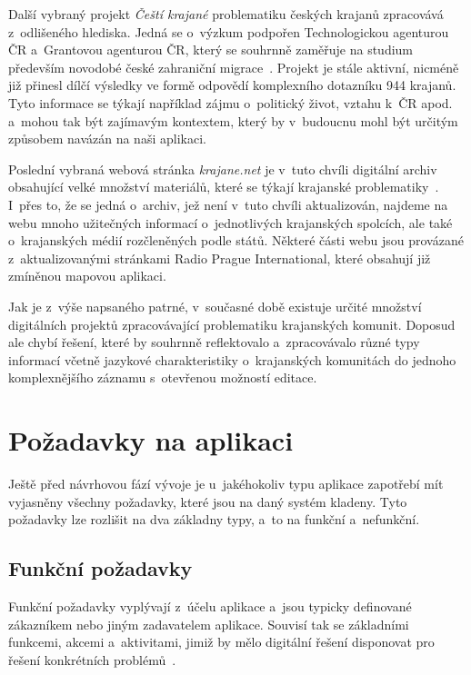Další vybraný projekt \emph{Čeští krajané} problematiku českých krajanů zpracovává z~odlišeného hlediska. Jedná se o~výzkum podpořen Technologickou agenturou ČR a~Grantovou agenturou ČR, který se souhrnně zaměřuje na studium především novodobé české zahraniční migrace~\parencite{cesti-krajane}. Projekt je stále aktivní, nicméně již přinesl dílčí výsledky ve formě odpovědí komplexního dotazníku 944 krajanů. Tyto informace se týkají například zájmu o~politický život, vztahu k~ČR apod. a~mohou tak být zajímavým kontextem, který by v~budoucnu mohl být určitým způsobem navázán na naši aplikaci.

Poslední vybraná webová stránka \emph{krajane.net} je v~tuto chvíli digitální archiv obsahující velké množství materiálů, které se týkají krajanské problematiky~\parencite{krajane-archiv}. I~přes to, že se jedná o~archiv, jež není v~tuto chvíli aktualizován, najdeme na webu mnoho užitečných informací o~jednotlivých krajanských spolcích, ale také o~krajanských médií rozčleněných podle států. Některé části webu jsou provázané z~aktualizovanými stránkami Radio Prague International, které obsahují již zmíněnou mapovou aplikaci.

Jak je z~výše napsaného patrné, v~současné době existuje určité množství digitálních projektů zpracovávající problematiku krajanských komunit. Doposud ale chybí řešení, které by souhrnně reflektovalo a~zpracovávalo různé typy informací včetně jazykové charakteristiky o~krajanských komunitách do jednoho komplexnějšího záznamu s~otevřenou možností editace.

\hypertarget{poux17eadavky-na-aplikaci}{%
\section{Požadavky na aplikaci}\label{poux17eadavky-na-aplikaci}}

Ještě před návrhovou fází vývoje je u~jakéhokoliv typu aplikace zapotřebí mít vyjasněny všechny požadavky, které jsou na daný systém kladeny. Tyto požadavky lze rozlišit na dva základny typy, a~to na funkční a~nefunkční.

\hypertarget{funkux10dnuxed-poux17eadavky}{%
\subsection{Funkční požadavky}\label{funkux10dnuxed-poux17eadavky}}

Funkční požadavky vyplývají z~účelu aplikace a~jsou typicky definované zákazníkem nebo jiným zadavatelem aplikace. Souvisí tak se základními funkcemi, akcemi a~aktivitami, jimiž by mělo digitální řešení disponovat pro řešení konkrétních problémů~\parencite{Gorton2006}.

